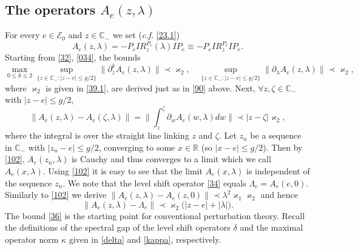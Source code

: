 \documentclass[letterpaper,onecolumn,11pt,accepted=2021-12-09]{quantumarticle}
\numberwithin{equation}{section}
\begin{document}
\subsection{The operators $A_e(z,\lambda)$}
\label{sectAe}

For every $e\in{\mathcal E}_0$  and $z\in{\mathbb C}_- $ we set ({\em c.f.} \eqref{23.1}) 
\begin{equation}
	\label{31}
	A_e(z,\lambda) = - P_e I  R_z^{P_e}(\lambda) IP_e \equiv - P_e I  R_z^{P_e} IP_e.
\end{equation}
Starting from \eqref{32}, \eqref{034}, the bounds 
\begin{equation}
	\max_{0\le k\le 2}	\sup_{\{z\in{\mathbb C}_- : |z-e|\le g/2\}}\| \partial_z^k A_e(z,\lambda) \|\prec \varkappa_2, \quad \sup_{\{z\in{\mathbb C}_- : |z-e|\le g/2\}}\| \partial_\lambda A_e(z,\lambda)\|\prec \varkappa_2,
	\label{100}
\end{equation}
where $\varkappa_2$ is given in \eqref{39.1},  are derived just as in \eqref{90} above. Next, $\forall z,\zeta\in {\mathbb C}_-$ with $|z-e|\le g/2$, 
\begin{equation}
\| A_e(z,\lambda) - A_e(\zeta,\lambda) \| = \Big\| \int_z^\zeta \partial_w A_e(w,\lambda) dw\Big\| \prec |z-\zeta|\varkappa_2,
\label{102}
\end{equation}
where the integral is over the straight line linking $z$ and $\zeta$. Let  $z_n$ be a sequence in ${\mathbb C}_-$ with $|z_n-e|\le g/2$, converging to some $x\in\mathbb R$ (so $|x-e|\le g/2$). Then by \eqref{102}, $A_e(z_n,\lambda)$ is Cauchy and thus converges to a limit which we call $A_e(x,\lambda)$. Using \eqref{102} it is easy to see that the limit $A_e(x,\lambda)$ is independent of the sequence $z_n$.  We note that the level shift operator \eqref{34} equals $\Lambda_e = A_e(e,0)$.  Similarly to \eqref{102} we derive  $\|A_e(z,\lambda)-A_e(z,0)\|\prec \lambda^2\varkappa_1 \varkappa_2$ and hence
\begin{equation}
	\label{36}
	\| A_e(z,\lambda)-\Lambda_e\| \prec\varkappa_2 \big(|z-e|+|\lambda|\big).
\end{equation} 
The bound \eqref{36} is the starting point for conventional perturbation theory. Recall the definitions of the spectral gap of the level shift operators $\delta$ and the maximal operator norm $\kappa$ given in \eqref{delta} and \eqref{kappa}, respectively. 
\end{document}
